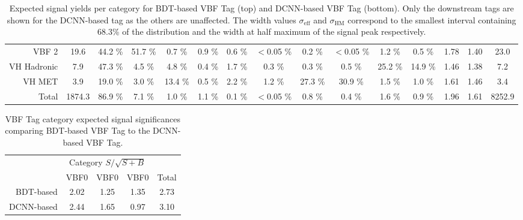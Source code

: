\begin{landscape}
\begin{table}
{\begin{tabular}{rcccccccccccccc}
        \rowcolor{VBF2} VBF 2 &    19.6  &  44.2 \% &  51.7 \% &  0.7 \% &  0.9 \% &  0.6 \% &  $<$0.05 \% &  0.2 \% &  $<$0.05 \% &  1.2 \% &  0.5 \%& 1.78 & 1.40 & 23.0 \\
        \rowcolor{VHH} VH Hadronic &    7.9  &  47.3 \% &  4.5 \% &  4.8 \% &  0.4 \% &  1.7 \% &  0.3 \% &  0.3 \% &  0.5 \% &  25.2 \% &  14.9 \%& 1.46 & 1.38 & 7.2 \\
        \rowcolor{VHM} VH MET &    3.9  &  19.0 \% &  3.0 \% &  13.4 \% &  0.5 \% &  2.2 \% &  1.2 \% &  27.3 \% &  30.9 \% &  1.5 \% &  1.0 \%& 1.61 & 1.46 & 3.4 \\
        \rowcolor{Gray} Total &    1874.3  &  86.9 \% &  7.1 \% &  1.0 \% &  1.1 \% &  0.1 \% &  $<$0.05 \% &  0.8 \% &  0.4 \% &  1.6 \% &  0.9 \%& 1.96 & 1.61 & 8252.9 \\
        \hline
        \hline
        \end{tabular}%
    }
        \caption{Expected signal yields per category for BDT-based VBF Tag (top) and DCNN-based VBF Tag (bottom). 
                 Only the downstream tags are shown for the DCNN-based tag as the others are unaffected.
                 The width values $\sigma_{\text{eff}}$ and $\sigma_{\text{HM}}$ correspond to the smallest interval 
                 containing 68.3\% of the \mgg distribution and the width at half maximum of the signal peak respectively.}
        \label{tab:stats_results:yield_table}
    \end{table}

\end{landscape}
\begin{table}[h!]
    \begin{tabular}{rcccc}
        \hline
        \hline
        & \multicolumn{3}{c}{Category $S/\sqrt{S+B}$} & \\ 
        & VBF0 & VBF0 & VBF0 & Total \\
        \hline
        BDT-based  & 2.02 & 1.25 & 1.35 & 2.73\\
        DCNN-based & 2.44 & 1.65 & 0.97 & 3.10\\
        \hline
        \hline
    \end{tabular}
    \caption{VBF Tag category expected signal significances comparing BDT-based VBF Tag to the DCNN-based VBF Tag.}
    \label{tab:stats_results:sig_table}
\end{table}












